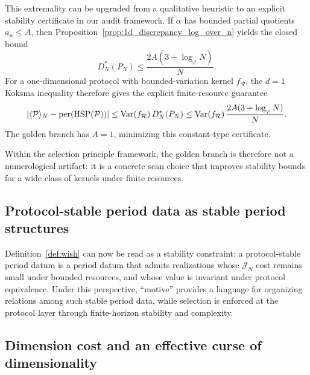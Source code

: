 This extremality can be upgraded from a qualitative heuristic to an explicit stability certificate in our audit framework. If $\alpha$ has bounded partial quotients $a_n\le A$, then Proposition~\ref{prop:1d_discrepancy_log_over_n} yields the closed bound
\[
D_N^\ast(P_N)\le \frac{2A(3+\log_\varphi N)}{N}.
\]
For a one-dimensional protocol with bounded-variation kernel $f_{\mathcal{R}}$, the $d=1$ Koksma inequality therefore gives the explicit finite-resource guarantee
\[
\left|\langle \mathcal{P} \rangle_N-\mathrm{per}(\mathrm{HSP}(\mathcal{P}))\right|
\le \mathrm{Var}(f_{\mathcal{R}})\,D_N^\ast(P_N)
\le \mathrm{Var}(f_{\mathcal{R}})\,\frac{2A(3+\log_\varphi N)}{N}.
\]
The golden branch has $A=1$, minimizing this constant-type certificate.

Within the selection principle framework, the golden branch is therefore not a numerological artifact: it is a concrete scan choice that improves stability bounds for a wide class of kernels under finite resources.

\subsection{Protocol-stable period data as stable period structures}
\label{sec:wishes_as_stable_periods}

Definition~\ref{def:wish} can now be read as a stability constraint: a protocol-stable period datum is a period datum that admits realizations whose $\mathcal{J}_N$ cost remains small under bounded resources, and whose value is invariant under protocol equivalence. Under this perspective, ``motive'' provides a language for organizing relations among such stable period data, while selection is enforced at the protocol layer through finite-horizon stability and complexity.

\subsection{Dimension cost and an effective curse of dimensionality}
\label{sec:dimension_cost}

